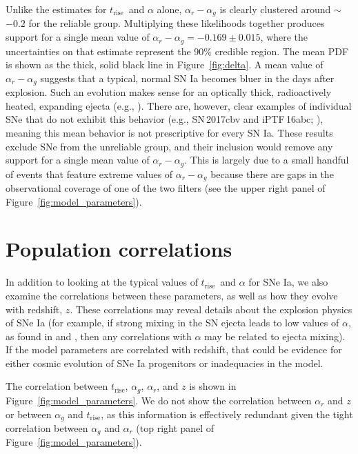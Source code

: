 \documentclass[twocolumn]{./aastex63}
\newcommand{\trise}{$t_\mathrm{rise}$}
\begin{document}
Unlike the estimates for \trise\ and $\alpha$ alone, $\alpha_r - \alpha_g$ is
clearly clustered around $\sim$${-0.2}$ for the reliable group. Multiplying
these likelihoods together produces support for a single mean value of
$\alpha_r - \alpha_g = -0.169 \pm 0.015$, where the uncertainties on that
estimate represent the 90\% credible region. The mean PDF is shown as the
thick, solid black line in Figure~\ref{fig:delta}. A mean value of $\alpha_r -
\alpha_g$ suggests that a typical, normal SN Ia becomes bluer in the days
after explosion. Such an evolution makes sense for an optically thick,
radioactively heated, expanding ejecta (e.g., \citealt{Piro16,Magee19}). There
are, however, clear examples of individual SNe that do not exhibit this
behavior (e.g., SN\,2017cbv and iPTF\,16abc;
\citealt{Hosseinzadeh17,Miller18}), meaning this mean behavior is not
prescriptive for every SN Ia. These results exclude SNe from the unreliable
group, and their inclusion would remove any support for a single mean value of
$\alpha_r - \alpha_g$. This is largely due to a small handful of events that
feature extreme values of $\alpha_r - \alpha_g$ because there are gaps in the
observational coverage of one of the two filters (see the upper right panel of
Figure~\ref{fig:model_parameters}).

\section{Population correlations}

In addition to looking at the typical values of \trise\ and $\alpha$ for SNe
Ia, we also examine the correlations between these parameters, as well as how
they evolve with redshift, $z$. These correlations may reveal details about
the explosion physics of SNe Ia (for example, if strong mixing in the SN
ejecta leads to low values of $\alpha$, as found in \citealt{Piro16} and
\citealt{Magee18}, then any correlations with $\alpha$ may be related to
ejecta mixing). If the model parameters are correlated with redshift, that
could be evidence for either cosmic evolution of SNe Ia progenitors or
inadequacies in the model.

The correlation between $t_\mathrm{rise}$, $\alpha_g$, $\alpha_r$, and $z$ is
shown in Figure~\ref{fig:model_parameters}. We do not show the correlation
between $\alpha_r$ and $z$ or between $\alpha_g$ and \trise, as this
information is effectively redundant given the tight correlation between
$\alpha_g$ and $\alpha_r$ (top right panel of
Figure~\ref{fig:model_parameters}).
\end{document}
